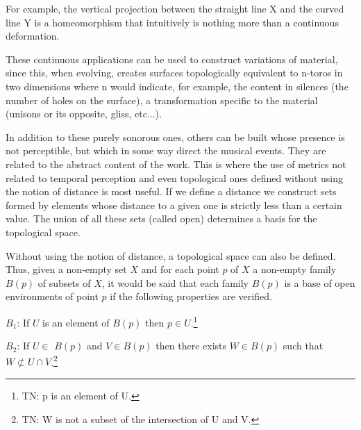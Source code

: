 \begin{figure}[H]
\centering
{}
    \label{fig:guerrero-graph}
\end{figure}

For example, the vertical projection between the straight line X and the curved line Y is a homeomorphism that intuitively is nothing more than a continuous deformation.

These continuous applications can be used to construct variations of material, since this, when evolving, creates surfaces topologically equivalent to n-toros in two dimensions where n would indicate, for example, the content in silences (the number of holes on the surface), a transformation specific to the material (unisons or its opposite, gliss, etc...).

In addition to these purely sonorous ones, others can be built whose presence is not perceptible, but which in some way direct the musical events. They are related to the abstract content of the work. This is where the use of metrics not related to temporal perception and even topological ones defined without using the notion of distance is most useful. If we define a distance we construct sets formed by elements whose distance to a given one is strictly less than a certain value. The union of all these sets (called open) determines a basis for the topological space.

Without using the notion of distance, a topological space can also be defined. Thus, given a non-empty set $X$ and for each point $p$ of $X$ a non-empty family $B(p)$ of subsets of $X$, it would be said that each family $B(p)$ is a base of open environments of point $p$ if the following properties are verified.

$B_{1}$: If $U$ is an element of $B(p)$ then $p \in U$.\footnote{TN: p is an element of U.}

$B_{2}$: If $U \in$ $B(p)$ and $V \in B(p)$ then there exists $W \in B(p)$ such that $W \not\subset U \cap V$.\footnote{TN: W is not a subset of the intersection of U and V.}

